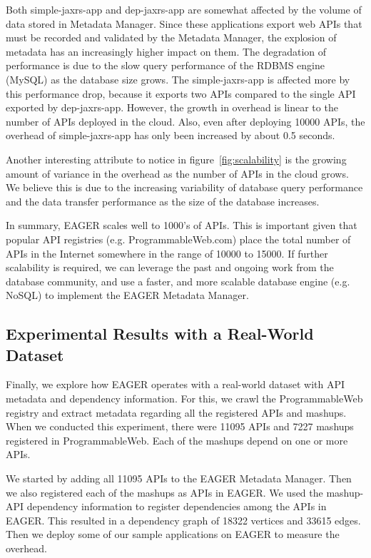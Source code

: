 Both simple-jaxrs-app and dep-jaxrs-app are
somewhat affected by the volume of data stored in Metadata Manager. Since these applications export web APIs that must be 
recorded and validated by the Metadata Manager, the explosion of metadata has an increasingly higher impact on them. The degradation 
of performance is due to the slow query performance of the RDBMS engine (MySQL) as the database size grows. The simple-jaxrs-app
is affected more by this performance drop, because it exports two APIs compared to the single API exported 
by dep-jaxrs-app. However, the growth
in overhead is linear to the number of APIs deployed in the cloud. Also,
even after deploying 10000 APIs, the overhead of simple-jaxrs-app has only been increased by about 0.5 seconds.

Another interesting attribute to notice in figure~\ref{fig:scalability} is the growing amount of variance in the overhead as the number of APIs in the cloud grows.
We believe this is due to the increasing variability of database query performance and the data transfer performance as the size of the 
database increases.

In summary, EAGER scales well to 1000's of APIs. This is important given that popular API registries (e.g. ProgrammableWeb.com) 
place the total number of APIs in the Internet somewhere in the range of 10000 to 15000. If further scalability is required, we can leverage the past and ongoing
work from the database community, and use a faster, and more scalable database engine (e.g. NoSQL) to implement the
EAGER Metadata Manager.

\subsection{Experimental Results with a Real-World Dataset}
Finally, we explore how EAGER operates with a real-world dataset with API metadata and dependency information. For this, we 
crawl the ProgrammableWeb registry and extract metadata regarding all the registered APIs and mashups. When we conducted
this experiment, there were 11095 APIs and 7227 mashups registered in ProgrammableWeb. Each of the mashups depend on one or more APIs.

We started by adding all 11095 APIs to the EAGER Metadata Manager. Then we also registered each of the mashups as APIs in EAGER. We used the
mashup-API dependency information to register dependencies among the APIs in EAGER. This resulted in a 
dependency graph of 18322 vertices and 33615 edges. Then we deploy
some of our sample applications on EAGER to measure the overhead.

